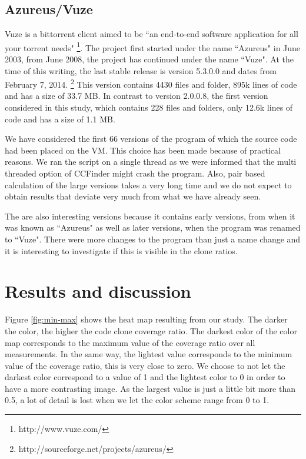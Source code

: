 \documentclass[a4paper,twoside, twocolumn, 11pt]{article}
\numberwithin{equation}{section}
\begin{document}
\subsection{Azureus/Vuze}
Vuze is a bittorrent client aimed to be ``an end-to-end software application for all your torrent needs" \footnote{http://www.vuze.com/}.
The project first started under the name ``Azureus" in June 2003, from June 2008, the project has continued under the name ``Vuze".
At the time of this writing, the last stable release is version 5.3.0.0 and dates from February 7, 2014. \footnote{http://sourceforge.net/projects/azureus/}
This version contains 4430 files and folder, 895k lines of code and has a size of 33.7 MB. 
In contrast to version 2.0.0.8, the first version considered in this study, which contains 228 files and folders, only 12.6k lines of code and has a size of 1.1 MB.

We have considered the first 66 versions of the program of which the source code had been placed on the VM. 
This choice has been made because of practical reasons. 
We ran the script on a single thread as we were informed that the multi threaded option of CCFinder might crash the program. 
Also, pair based calculation of the large versions takes a very long time and we do not expect to obtain results that deviate very much from what we have already seen.

The are also interesting versions because it contains early versions, from when it was known as ``Azureus" as well as later versions, when the program was renamed to ``Vuze".
There were more changes to the program than just a name change %
and it is interesting to investigate if this is visible in the clone ratios.

\section{Results and discussion}
Figure \ref{fig:min-max} shows the heat map resulting from our study. 
The darker the color, the higher the code clone coverage ratio. 
The darkest color of the color map corresponds to the maximum value of the coverage ratio over all measurements.
In the same way, the lightest value corresponds to the minimum value of the coverage ratio, this is very close to zero. 
We choose to not let the darkest color correspond to a value of 1 and the lightest color to 0 in order to have a more contrasting image.
As the largest value is just a little bit more than 0.5, a lot of detail is lost when we let the color scheme range from 0 to 1.
\end{document}

